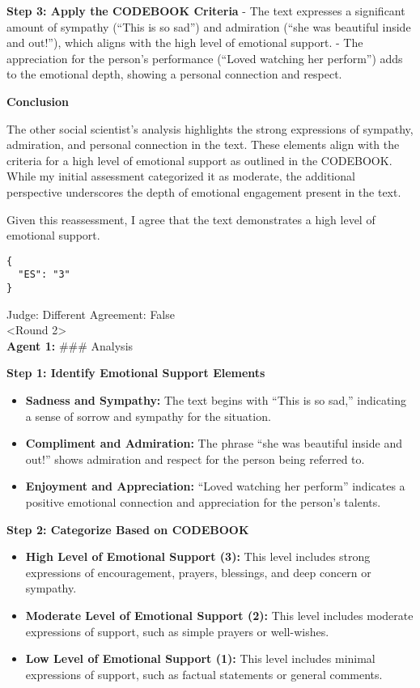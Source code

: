 \textbf{Step 3: Apply the CODEBOOK Criteria} - The text expresses a
significant amount of sympathy (``This is so sad'') and admiration
(``she was beautiful inside and out!''), which aligns with the high
level of emotional support. - The appreciation for the person's
performance (``Loved watching her perform'') adds to the emotional
depth, showing a personal connection and respect.

\textbf{Conclusion}

The other social scientist's analysis highlights the strong expressions
of sympathy, admiration, and personal connection in the text. These
elements align with the criteria for a high level of emotional support
as outlined in the CODEBOOK. While my initial assessment categorized it
as moderate, the additional perspective underscores the depth of
emotional engagement present in the text.

Given this reassessment, I agree that the text demonstrates a high level
of emotional support.

\begin{verbatim}
{
  "ES": "3"
}
\end{verbatim}

Judge: Different Agreement: False\\

<Round 2>\\

\textbf{Agent 1:} \#\#\# Analysis

\textbf{Step 1: Identify Emotional Support Elements}

\begin{itemize}
\tightlist
\item
  \textbf{Sadness and Sympathy:} The text begins with ``This is so
  sad,'' indicating a sense of sorrow and sympathy for the situation.
\item
  \textbf{Compliment and Admiration:} The phrase ``she was beautiful
  inside and out!'' shows admiration and respect for the person being
  referred to.
\item
  \textbf{Enjoyment and Appreciation:} ``Loved watching her perform''
  indicates a positive emotional connection and appreciation for the
  person's talents.
\end{itemize}

\textbf{Step 2: Categorize Based on CODEBOOK}

\begin{itemize}
\tightlist
\item
  \textbf{High Level of Emotional Support (3):} This level includes
  strong expressions of encouragement, prayers, blessings, and deep
  concern or sympathy.
\item
  \textbf{Moderate Level of Emotional Support (2):} This level includes
  moderate expressions of support, such as simple prayers or
  well-wishes.
\item
  \textbf{Low Level of Emotional Support (1):} This level includes
  minimal expressions of support, such as factual statements or general
  comments.
\end{itemize}

